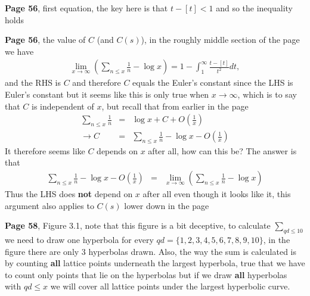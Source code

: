 \documentclass[aps,preprint,preprintnumbers,nofootinbib,showpacs,prd]{revtex4-1}
\newcommand{\nbea}{\begin{eqnarray*}}
\newcommand{\neea}{\end{eqnarray*}}
\begin{document}
{\bf Page 56}, first equation, the key here is that $t-[t] < 1$ and so the inequality holds

{\bf Page 56}, the value of $C$ (and $C(s)$), in the roughly middle section of the page we have
%
\nbea
\lim_{x\to\infty}\left ( \sum_{n \le x} \frac{1}{n} - \log x\right) = 1 - \int_1^\infty \frac{t - [t]}{t^2} dt,
\neea
%
and the RHS is $C$ and therefore $C$ equals the Euler's constant since the LHS is Euler's constant but it seems like this is only true when $x \to \infty$, which is to say that $C$ is independent of $x$, but recall that from earlier in the page
%
\nbea
\sum_{n\le x} \frac{1}{n} & = & \log x + C + O\left ( \frac{1}{x}\right ) \\
\to C & = & \sum_{n\le x} \frac{1}{n} - \log x - O\left ( \frac{1}{x}\right ) 
\neea
%
It therefore seems like $C$ depends on $x$ after all, how can this be? The answer is that
%
\nbea
\sum_{n\le x} \frac{1}{n} - \log x - O\left ( \frac{1}{x}\right ) & = & \lim_{x\to\infty}\left ( \sum_{n \le x} \frac{1}{n} - \log x\right)
\neea
%
Thus the LHS does {\bf not} depend on $x$ after all even though it looks like it, this argument also applies to $C(s)$ lower down in the page

{\bf Page 58}, Figure 3.1, note that this figure is a bit deceptive, to calculate $\sum_{qd \le 10}$ we need to draw one hyperbola for every $qd = \{1,2,3,4,5,6,7,8,9,10\}$, in the figure there are only 3 hyperbolas drawn. Also, the way the sum is calculated is by counting {\bf all} lattice points underneath the largest hyperbola, true that we have to count only points that lie on the hyperbolas but if we draw {\bf all} hyperbolas with $qd \le x$ we will cover all lattice points under the largest hyperbolic curve.
\end{document}

